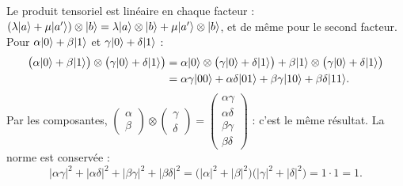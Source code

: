 Le produit tensoriel est linéaire en chaque facteur :
$(\lambda|a\rangle+\mu|a'\rangle)\otimes|b\rangle=\lambda|a\rangle\otimes|b\rangle+\mu|a'\rangle\otimes|b\rangle$,
et de même pour le second facteur. Pour $\alpha|0\rangle+\beta|1\rangle$ et
$\gamma|0\rangle+\delta|1\rangle$ :
\begin{align*}
  \big(\alpha|0\rangle+\beta|1\rangle\big)\otimes\big(\gamma|0\rangle+\delta|1\rangle\big)
  &=\alpha|0\rangle\otimes\big(\gamma|0\rangle+\delta|1\rangle\big)
    +\beta|1\rangle\otimes\big(\gamma|0\rangle+\delta|1\rangle\big)\\
  &=\alpha\gamma|00\rangle+\alpha\delta|01\rangle+\beta\gamma|10\rangle+\beta\delta|11\rangle.
\end{align*}
Par les composantes, $\begin{pmatrix}\alpha\\ \beta\end{pmatrix}\otimes\begin{pmatrix}\gamma\\ \delta\end{pmatrix}
=\begin{pmatrix}\alpha\gamma\\ \alpha\delta\\ \beta\gamma\\ \beta\delta\end{pmatrix}$ : c'est le même
résultat. La norme est conservée :
\[
  |\alpha\gamma|^2+|\alpha\delta|^2+|\beta\gamma|^2+|\beta\delta|^2
  =\big(|\alpha|^2+|\beta|^2\big)\big(|\gamma|^2+|\delta|^2\big)=1\cdot1=1 .
\]

